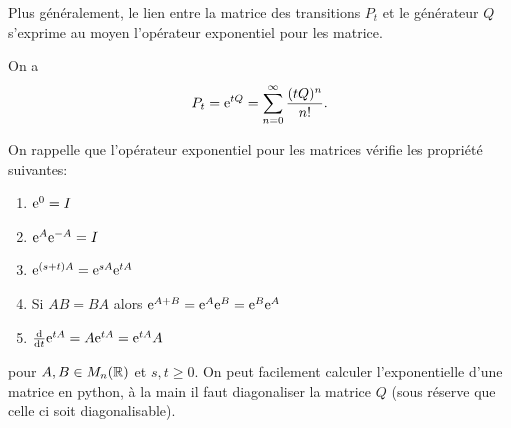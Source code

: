 Plus généralement, le lien entre la matrice des transitions $P_t$ et le générateur $Q$ s'exprime au moyen l'opérateur exponentiel pour les matrice. 
\begin{prop}
On a 
$$
P_t = \mathrm{e}^{tQ} = \sum_{n=0}^\infty\frac{(tQ)^n}{n!}.
$$
\end{prop} 
On rappelle que l'opérateur exponentiel pour les matrices vérifie les propriété suivantes:
\begin{enumerate}
	\item $\mathrm{e}^0 = I$
	\item $\mathrm{e}^A\mathrm{e}^{-A} = I$
	\item $\mathrm{e}^{(s+t)A} = \mathrm{e}^{sA}\mathrm{e}^{tA}$
	\item Si $AB = BA$ alors $\mathrm{e}^{A+B}=\mathrm{e}^{A}\mathrm{e}^{B}=\mathrm{e}^{B}\mathrm{e}^{A}$
	\item $\frac{\text{d}}{\text{d}t}\mathrm{e}^{tA} = A\mathrm{e}^{tA} = \mathrm{e}^{tA}A$
\end{enumerate}
pour $A,B\in M_n(\mathbb{R})$ et $s,t\geq0$. On peut facilement calculer l'exponentielle d'une matrice en python, à la main il faut diagonaliser la matrice $Q$ (sous réserve que celle ci soit diagonalisable).
